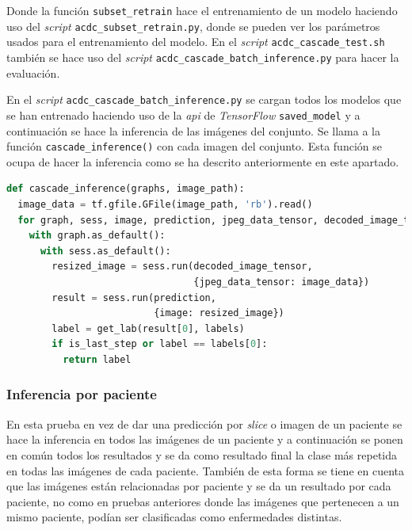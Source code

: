 \documentclass[12pt,a4paper]{article}
\begin{document}
Donde la función \texttt{subset\_retrain} hace el entrenamiento de un modelo haciendo uso del \textit{script} \texttt{acdc\_subset\_retrain.py}, donde se pueden ver los parámetros usados para el entrenamiento del modelo. En el \textit{script} \texttt{acdc\_cascade\_test.sh} también se hace uso del \textit{script} \texttt{acdc\_cascade\_batch\_inference.py} para hacer la evaluación.
\bigskip

En el \textit{script} \texttt{acdc\_cascade\_batch\_inference.py} se cargan todos los modelos que se han entrenado haciendo uso de la \textit{api} de \textit{TensorFlow} \texttt{saved\_model} y a continuación se hace la inferencia de las imágenes del conjunto. Se llama a la función \texttt{cascade\_inference()} con cada imagen del conjunto. Esta función se ocupa de hacer la inferencia como se ha descrito anteriormente en este apartado.

\begin{lstlisting}[language=Python]
def cascade_inference(graphs, image_path):
  image_data = tf.gfile.GFile(image_path, 'rb').read()
  for graph, sess, image, prediction, jpeg_data_tensor, decoded_image_tensor, labels, is_last_step in zip(graphs['graph'], graphs['sess'], graphs['image'], graphs['prediction'], graphs['jpeg_data_tensor'], graphs['decoded_image_tensor'], graphs['labels'], graphs['is_last_step']):
    with graph.as_default():
      with sess.as_default():
        resized_image = sess.run(decoded_image_tensor,
                                 {jpeg_data_tensor: image_data})
        result = sess.run(prediction,
                          {image: resized_image})
        label = get_lab(result[0], labels)
        if is_last_step or label == labels[0]:
          return label
\end{lstlisting}

\subsubsection{Inferencia por paciente}
En esta prueba en vez de dar una predicción por \textit{slice} o imagen de un paciente se hace la inferencia en todos las imágenes de un paciente y a continuación se ponen en común todos los resultados y se da como resultado final la clase más repetida en todas las imágenes de cada paciente. También de esta forma se tiene en cuenta que las imágenes están relacionadas por paciente y se da un resultado por cada paciente, no como en pruebas anteriores donde las imágenes que pertenecen a un mismo paciente, podían ser clasificadas como enfermedades distintas.
\end{document}
